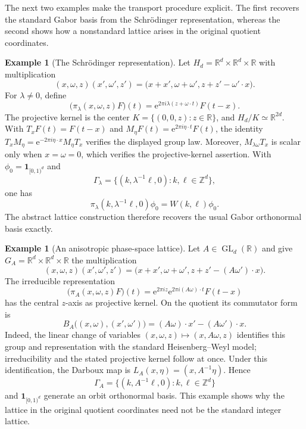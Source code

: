 \documentclass[reqno]{amsart}
\numberwithin{equation}{section}
\theoremstyle{definition}
\newtheorem{example}[theorem]{Example}
\theoremstyle{remark}
\newcommand{\R}{\mathbb R}
\newcommand{\e}{\mathrm e}
\begin{document}
The next two examples make the transport procedure explicit.  The first
recovers the standard Gabor basis from the Schr\"odinger representation,
whereas the second shows how a nonstandard lattice arises in the original
quotient coordinates.

\begin{example}[The Schr\"odinger representation]\label{ex:heisenberg}
Let $H_d=\R^d\times\R^d\times\R$ with multiplication
\[
 (x,\omega,z)(x',\omega',z')
 =\bigl(x+x',\omega+\omega',z+z'-\omega'\cdot x\bigr).
\]
For $\lambda\neq0$, define
\begin{equation}\label{eq:Schrodinger-representation}
 \bigl(\pi_\lambda(x,\omega,z)F\bigr)(t)
 =\e^{2\pi i\lambda(z+\omega\cdot t)}F(t-x).
\end{equation}
The projective kernel is the center
$K=\{(0,0,z):z\in\R\}$, and $H_d/K\simeq\R^{2d}$.  With
$T_xF(t)=F(t-x)$ and $M_\eta F(t)=\e^{2\pi i\eta\cdot t}F(t)$, the identity
$T_xM_\eta=\e^{-2\pi i\eta\cdot x}M_\eta T_x$ verifies the displayed
group law.  Moreover, $M_{\lambda\omega}T_x$ is scalar only when
$x=\omega=0$, which verifies the projective-kernel assertion.  With
$\phi_0=\mathbf1_{[0,1)^d}$ and
\[
 \Gamma_\lambda
 =\{(k,\lambda^{-1}\ell,0):k,\ell\in\mathbb Z^d\},
\]
one has
\[
 \pi_\lambda(k,\lambda^{-1}\ell,0)\phi_0
 =W(k,\ell)\phi_0.
\]
The abstract lattice construction therefore recovers the usual Gabor
orthonormal basis exactly.
\end{example}

\begin{example}[An anisotropic phase-space lattice]
\label{ex:anisotropic}
Let $A\in\operatorname{GL}_d(\R)$ and give
$G_A=\R^d\times\R^d\times\R$ the multiplication
\[
 (x,\omega,z)(x',\omega',z')
 =\bigl(x+x',\omega+\omega',
        z+z'-(A\omega')\cdot x\bigr).
\]
The irreducible representation
\[
 \bigl(\pi_A(x,\omega,z)F\bigr)(t)
 =\e^{2\pi iz}\e^{2\pi i(A\omega)\cdot t}F(t-x)
\]
has the central $z$-axis as projective kernel.  On the quotient its
commutator form is
\[
 B_A\bigl((x,\omega),(x',\omega')\bigr)
 =(A\omega)\cdot x'-(A\omega')\cdot x.
\]
Indeed, the linear change of variables
$(x,\omega,z)\mapsto(x,A\omega,z)$ identifies this group and representation
with the standard Heisenberg--Weyl model; irreducibility and the stated
projective kernel follow at once.  Under this identification, the Darboux
map is $L_A(x,\eta)=(x,A^{-1}\eta)$.  Hence
\[
 \Gamma_A
 =\{(k,A^{-1}\ell,0):k,\ell\in\mathbb Z^d\}
\]
and $\mathbf1_{[0,1)^d}$ generate an orbit orthonormal basis.  This example
shows why the lattice in the original quotient coordinates need not be the
standard integer lattice.
\end{example}
\end{document}
